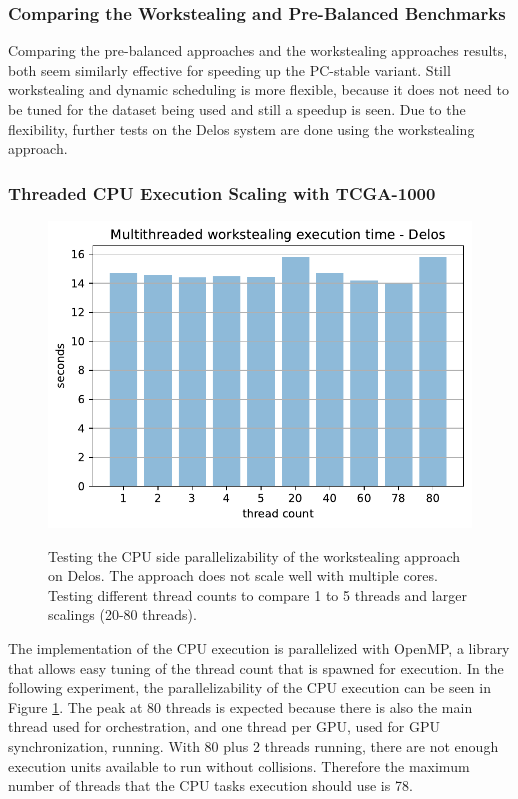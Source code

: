 \subsubsection{Comparing the Workstealing and Pre-Balanced Benchmarks}
Comparing the pre-balanced approaches and the workstealing approaches results, both seem similarly effective for speeding up the PC-stable variant. Still workstealing and dynamic scheduling is more flexible, because it does not need to be tuned for the dataset being used and still a speedup is seen. Due to the flexibility, further tests on the Delos system are done using the workstealing approach.

\subsubsection{Threaded CPU Execution Scaling with TCGA-1000}
\begin{figure}[H]
  \caption{Testing the CPU side parallelizability of the workstealing approach on Delos. The approach does not scale well with multiple cores. Testing different thread counts to compare 1 to 5 threads and larger scalings (20-80 threads).}
  \includegraphics[width=\textwidth]{figures/threaded_wsteal.pdf}
  \centering
  \label{fig:wstealing_threaded_delos}
\end{figure}

The implementation of the CPU execution is parallelized with OpenMP, a library that allows easy tuning of the thread count that is spawned for execution. In the following experiment, the parallelizability of the CPU execution can be seen in Figure \ref{fig:wstealing_threaded_delos}.
The peak at 80 threads is expected because there is also the main thread used for orchestration, and one thread per GPU, used for GPU synchronization, running. With 80 plus 2 threads running, there are not enough execution units available to run without collisions. Therefore the maximum number of threads that the CPU tasks execution should use is 78.

